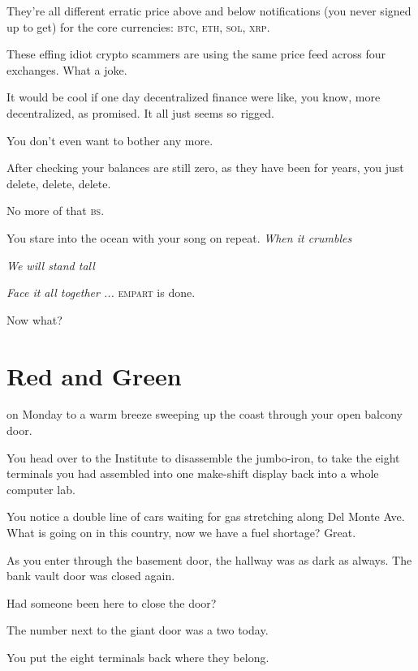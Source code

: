 \documentclass[a5paper, symmetric]{tufte-book}
\newcommand*{\smallamp}{\textsmaller[2]{\char"26} }
\begin{document}
They're all different erratic price above and below notifications (you never signed up to get) for the core currencies: \textsc{btc}, \textsc{eth}, \textsc{sol}, \smallamp  \textsc{xrp}.

These effing idiot crypto scammers are using the same price feed across four exchanges. What a joke. 

It would be cool if one day decentralized finance were like, you know, more decentralized, as promised. It all just seems so rigged.

You don't even want to bother any more. 

After checking your balances are still zero, as they have been for years, you just delete, delete, delete. 

No more of that \textsc{bs}.

You stare into the ocean with your song on repeat. 
\linebreak
\linebreak
\textit{When it crumbles}

\textit{We will stand tall}

\textit{Face it all together ...}
\linebreak
\linebreak
\textsc{empart} is done. 

Now what?


\chapter{Red and Green}
\label{ch:monday}

 on Monday to a warm breeze sweeping up the coast through your open balcony door. 

You head over to the Institute to disassemble the jumbo-iron, to take the eight terminals you had assembled into one make-shift display back into a whole computer lab. 

You notice a double line of cars waiting for gas stretching along Del Monte Ave. What is going on in this country, now we have a fuel shortage? Great. 

As you enter through the basement door, the hallway was as dark as always. The bank vault door was closed again.  

Had someone been here to close the door? 

The number next to the giant door was a two today. 

You put the eight terminals back where they belong. 
\end{document}
